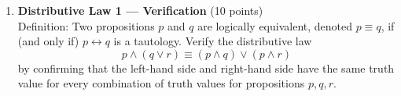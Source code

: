 \begin{enumerate}
  \begin{enumerate}
    \item $p \wedge F$\\
    \begin{subanswer}
      C
    \end{subanswer}
    \item $p \wedge p$\\
    \begin{subanswer}
      D
    \end{subanswer}
    \item $p \vee \bar{p}$\\
    \begin{subanswer}
      A
    \end{subanswer}
    \item $p \wedge \bar{p}$\\
    \begin{subanswer}
      C
    \end{subanswer}
    \item $p \vee \boldsymbol{F}$\\
    \begin{subanswer}
      D
    \end{subanswer}
    \item $p \vee p$\\
    \begin{subanswer}
      D
    \end{subanswer}
    \item $p \wedge T$\\
    \begin{subanswer}
      D
    \end{subanswer}
    \item $\overline{\bar{p}}$\\
    \begin{subanswer}
      D
    \end{subanswer}
    \item $p \vee \boldsymbol{T}$\\
    \begin{subanswer}
      A
    \end{subanswer}
  \end{enumerate}







  \newpage



  \item \textbf{Distributive Law 1 --- Verification} (10 points)\\
  Definition: Two propositions $p$ and $q$ are logically equivalent, denoted $p \equiv q$, if (and only if) $p \leftrightarrow q$ is a tautology. Verify the distributive law
  \[
    p \wedge (q \vee r) \equiv (p \wedge q) \vee (p \wedge r)
  \]
  by confirming that the left-hand side and right-hand side have the same truth value for every combination of truth values for propositions $p,q,r$.\\


\end{enumerate}
